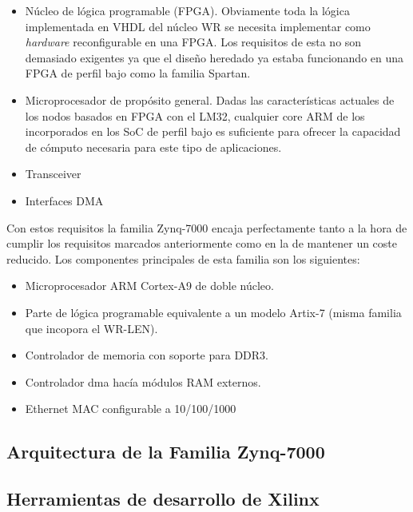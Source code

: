 \begin{itemize}
	\item Núcleo de lógica programable (FPGA). Obviamente toda la lógica 
	implementada en VHDL del núcleo WR se necesita implementar como 
	\textit{hardware} reconfigurable en una FPGA. Los requisitos de esta no son 
	demasiado exigentes ya que el diseño heredado ya estaba funcionando en una 
	FPGA de perfil bajo como la familia Spartan.
	
	\item Microprocesador de propósito general. Dadas las características 
	actuales de los nodos basados en FPGA con el LM32, cualquier core ARM de 
	los incorporados en los SoC de perfil bajo es suficiente para ofrecer la 
	capacidad de cómputo necesaria para este tipo de aplicaciones.
	
	\item Transceiver 
	
	\item Interfaces DMA 
	
\end{itemize}

Con estos requisitos la familia Zynq-7000 encaja perfectamente tanto a la hora 
de cumplir los requisitos marcados anteriormente como en la de mantener un 
coste reducido. Los componentes principales de esta familia son los siguientes:

\begin{itemize}
	\item Microprocesador ARM Cortex-A9 de doble núcleo.
	\item Parte de lógica programable equivalente a un modelo Artix-7 (misma 
	familia que incopora el WR-LEN).
	\item Controlador de memoria con soporte para DDR3.
	\item Controlador \gls{dma} hacía módulos RAM externos.
	\item Ethernet MAC configurable a 10/100/1000 
\end{itemize}


\subsection{Arquitectura de la Familia Zynq-7000}

\subsection{Herramientas de desarrollo de Xilinx}

